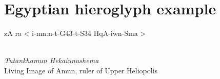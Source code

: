 \documentclass[a4paper]{article}
\begin{document}
	\section*{Egyptian hieroglyph example}
	
	\begin{hieroglyph}zA ra < i-mn:n-t-G43-t-S34 HqA-iwn-Sma >\end{hieroglyph} \\
	{\em Tutankhamun Hekaiunushema} \\
	Living Image of Amun, ruler of Upper Heliopolis
\end{document}
